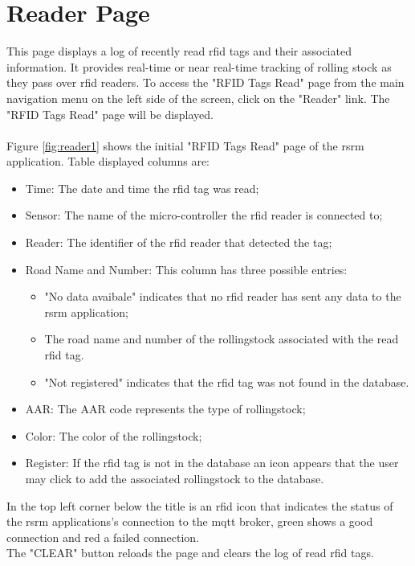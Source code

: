 \section{Reader Page}
This page displays a log of recently read \gls{rfid} tags and their associated information. It provides real-time or near real-time 
tracking of rolling stock as they pass over \gls{rfid} readers. To access the "RFID Tags Read" page from the main navigation menu on the 
left side of the screen, click on the "Reader" link. The "RFID Tags Read" page will be displayed.\\
\\
Figure \ref{fig:reader1} shows the initial "RFID Tags Read" page of the \gls{rsrm} application. Table displayed columns are:
\begin{itemize}
    \item Time: The date and time the \gls{rfid} tag was read;
    \item Sensor: The name of the micro-controller the \gls{rfid} reader is connected to;
    \item Reader: The identifier of the \gls{rfid} reader that detected the tag;
    \item Road Name and Number: This column has three possible entries:
    \begin{itemize} 
        \item "No data avaibale" indicates that no \gls{rfid} reader has sent any data to the \gls{rsrm} application;
        \item The road name and number of the rollingstock associated with the read \gls{rfid} tag.
        \item "Not registered" indicates that the \gls{rfid} tag was not found in the database.
    \end{itemize}
    \item AAR: The AAR code represents the type of rollingstock;
    \item Color: The color of the rollingstock;
    \item Register: If the \gls{rfid} tag is not in the database an icon appears that the user may click to add the associated 
    rollingstock to the database.
\end{itemize}
In the top left corner below the title is an \gls{rfid} icon that indicates the status of the \gls{rsrm} applications's connection to 
the \gls{mqtt} broker, green shows a good connection and red a failed connection.\\
The "CLEAR" button reloads the page and clears the log of read \gls{rfid} tags.

